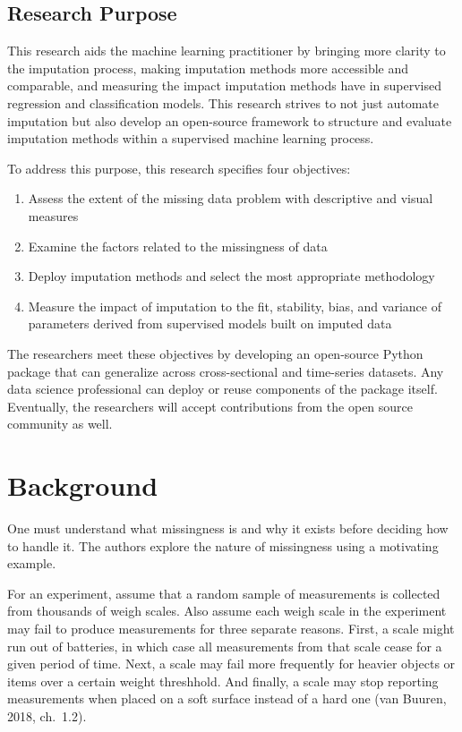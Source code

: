 \documentclass[12pt,oneside]{chicagocapstone}
\providecommand{\tightlist}{%
  \setlength{\itemsep}{0pt}\setlength{\parskip}{0pt}}
\begin{document}
\section*{Research Purpose}\label{research-purpose}

This research aids the machine learning practitioner by bringing more
clarity to the imputation process, making imputation methods more
accessible and comparable, and measuring the impact imputation methods
have in supervised regression and classification models. This research
strives to not just automate imputation but also develop an open-source
framework to structure and evaluate imputation methods within a
supervised machine learning process.

To address this purpose, this research specifies four objectives:
\begin{enumerate}
\def\labelenumi{\arabic{enumi}.}
\tightlist
\item
  Assess the extent of the missing data problem with descriptive and
  visual measures
\item
  Examine the factors related to the missingness of data
\item
  Deploy imputation methods and select the most appropriate methodology
\item
  Measure the impact of imputation to the fit, stability, bias, and
  variance of parameters derived from supervised models built on imputed
  data
\end{enumerate}
The researchers meet these objectives by developing an open-source
Python package that can generalize across cross-sectional and
time-series datasets. Any data science professional can deploy or reuse
components of the package itself. Eventually, the researchers will
accept contributions from the open source community as well.

\hypertarget{background}{\chapter*{Background}\label{background}}

One must understand what missingness is and why it exists before
deciding how to handle it. The authors explore the nature of missingness
using a motivating example.

For an experiment, assume that a random sample of measurements is
collected from thousands of weigh scales. Also assume each weigh scale
in the experiment may fail to produce measurements for three separate
reasons. First, a scale might run out of batteries, in which case all
measurements from that scale cease for a given period of time. Next, a
scale may fail more frequently for heavier objects or items over a
certain weight threshhold. And finally, a scale may stop reporting
measurements when placed on a soft surface instead of a hard one (van
Buuren, 2018, ch.~1.2).
\end{document}
